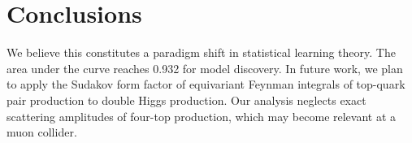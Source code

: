 \section{Conclusions}\label{sec:conclusions}

We believe this constitutes a paradigm shift in statistical learning
theory. The area under the curve reaches 0.932 for model discovery. In
future work, we plan to apply the Sudakov form factor of equivariant
Feynman integrals of top-quark pair production to double Higgs
production. Our analysis neglects exact scattering amplitudes of
four-top production, which may become relevant at a muon collider.

